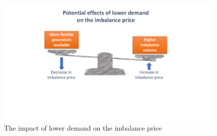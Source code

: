 \documentclass[energies,article,submit,moreauthors,pdftex]{Definitions/mdpi}
\begin{document}
\begin{figure}[H]
\centering
\hspace{-25pt}
\includegraphics[trim={4cm 6.3cm 5cm 1cm},clip,width=1\textwidth]{Graphics/Imbalance-price-trade-off.pdf}
\caption{The impact of lower demand on the imbalance price}
\label{fig:imbalance-price-trade-off}
\end{figure} 





\end{document}
